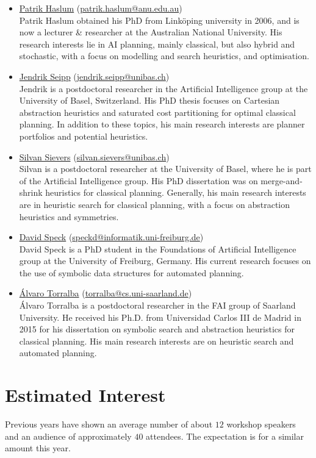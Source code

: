 \documentclass[10pt]{article}
\begin{document}
\begin{itemize}
\item \href{https://users.cecs.anu.edu.au/~patrik/}{Patrik Haslum}
(\href{mailto:patrik.haslum@anu.edu.au}{patrik.haslum@anu.edu.au})\\
Patrik Haslum obtained his PhD from Link\"oping university in 2006,
and is now a lecturer \& researcher at the Australian National
University. His research interests lie in AI planning, mainly classical,
but also hybrid and stochastic, with a focus on modelling and search
heuristics, and optimisation.

\item \href{https://ai.dmi.unibas.ch/people/seipp}{Jendrik Seipp}
(\href{mailto:jendrik.seipp@unibas.ch}{jendrik.seipp@unibas.ch})\\
Jendrik is a postdoctoral researcher in the Artificial Intelligence
group at the University of Basel, Switzerland. His PhD thesis focuses
on Cartesian abstraction heuristics and saturated cost partitioning
for optimal classical planning. In addition to these topics, his main
research interests are planner portfolios and potential heuristics.

\item \href{https://ai.dmi.unibas.ch/people/}{Silvan Sievers}
(\href{mailto:silvan.sievers@unibas.ch}{silvan.sievers@unibas.ch})\\
Silvan is a postdoctoral researcher at the University of Basel, where he is
part of the Artificial Intelligence group. His PhD dissertation was on
merge-and-shrink heuristics for classical planning. Generally, his main
research interests are in heuristic search for classical planning, with a focus
on abstraction heuristics and symmetries.

\item \href{http://}{David Speck}
(\href{mailto:speckd@informatik.uni-freiburg.de}{speckd@informatik.uni-freiburg.de})\\
David Speck is a PhD student in the Foundations of Artificial Intelligence
group at the University of Freiburg, Germany. His current research focuses on
the use of symbolic data structures for automated planning.

\item \href{http://}{{\'A}lvaro Torralba}
  (\href{mailto:torralba@cs.uni-saarland.de}{torralba@cs.uni-saarland.de})\\
  \'Alvaro Torralba is a postdoctoral researcher in the FAI group of Saarland
  University. He received his Ph.D. from Universidad Carlos III de Madrid in 2015 for his
  dissertation on symbolic search and abstraction heuristics for classical planning. His
  main research interests are on heuristic search and automated planning.


\end{itemize}

\section*{Estimated Interest}
Previous years have shown an average number of about $12$ workshop
speakers and an audience of approximately $40$ attendees. The
expectation is for a similar amount this year.
\end{document}

